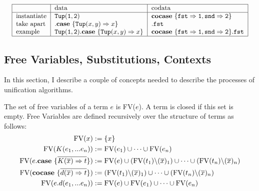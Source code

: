\documentclass[twoside,12pt,a4paper]{article}
\begin{document}
\begin{example}
    \begin{align*}
        \resizebox{\columnwidth}{!}{ %
            \begin{tabular}{|l | l | l|}
                \hline
                & data & codata\\
                \hline
                instantiate & $\mathtt{Tup(1,2)}$&  $\excopatmatch{\mathtt{fst\Rightarrow 1, snd\Rightarrow 2}}$\\
                take apart & $.\expatmatch{\mathttbrackets{Tup}{x, y}\Rightarrow x}$ & $.\mathtt{fst}$\\
                example & $\mathtt{Tup(1,2)}.\expatmatch{\mathttbrackets{Tup}{x, y}\Rightarrow x}$&$\excopatmatch{\mathtt{fst\Rightarrow 1, snd\Rightarrow 2}}.\mathtt{fst}$\\
               \hline
           \end{tabular}
        }
    \end{align*}        
\end{example}

\subsection{Free Variables, Substitutions, Contexts}

In this section, I describe a couple of concepts needed to describe the processes of unification algorithms. 

\begin{definition}
    The set of free variables of a term $e$ is FV($e$). A term is closed if this set is empty.
    Free Variables are defined recursively over the structure of terms as follows:
    \begin{align*}
        \begin{split}
            \text{FV}(x) &:= \{x\}\\
            \text{FV}(K(e_1,...e_n)) &:= \text{FV}(e_1) \cup \dots\cup \text{FV}(e_n)\\
            \text{FV}(e.\textbf{case}\ \{\overline{K(\overline{x})\Rightarrow t}\}) &:= \text{FV}(e)\cup (\text{FV}(t_1)\backslash(\overline{x})_1)\cup \dots\cup (\text{FV}(t_n)\backslash(\overline{x})_n)\\
            \text{FV}(\textbf{cocase}\ \{\overline{d(\overline{x})\Rightarrow t}\}) &:= (\text{FV}(t_1)\backslash(\overline{x})_1)\cup \dots\cup (\text{FV}(t_n)\backslash(\overline{x})_n)\\
            \text{FV}(e.d(e_1,...e_n)) &:= \text{FV}(e)\cup \text{FV}(e_1) \cup \dots \cup \text{FV}(e_n)    
        \end{split}
    \end{align*}
\end{definition}
\end{document}
